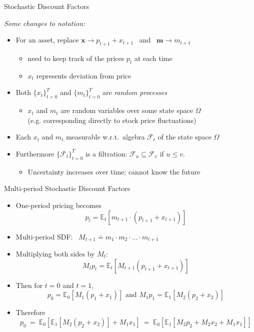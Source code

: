 \documentclass[aspectratio=1610]{beamer}
\newcommand{\wrt}{w.r.t.\ }
\newcommand{\eq}{\ =\ }
\newcommand{\andsp}{\text{ \ \ and \ \ }}
\newcommand{\bb}{\mathbb}
\newcommand{\mc}{\mathcal}
\begin{document}
\begin{frame}{Stochastic Discount Factors}
\begin{flushleft}
  \em Some changes to notation:
  \vspace{-1ex}
\end{flushleft}
\begin{itemize}
  \item For an asset, replace $\bm x \rightarrow p_{t+1} + x_{t+1}$ \ and \ $\bm m \rightarrow m_{t+1}$
  \begin{itemize}
    \item need to keep track of the prices $p_t$ at each time
    \item $x_t$ represents deviation from price
  \end{itemize}
  \item Both $\{x_t\}_{t=0}^T$ and $\{m_t\}_{t=0}^T$ are {\em random processes}
  \begin{itemize}
    \item $x_t$ and $m_t$ are random variables over some state space $\Omega$
    \\ (e.g. corresponding directly to stock price fluctuations)
  \end{itemize}
  \item Each $x_t$ and $m_t$ measurable \wrt algebra $\mc F_t$ of the state space $\Omega$
  \item Furthermore $\{\mc F_t\}_{t=0}^T$ is a filtration: $\mc F_u \subseteq \mc F_v$ if $u \leq v$.
  \begin{itemize}
    \item Uncertainty increases over time; cannot know the future
  \end{itemize}
\end{itemize}
\end{frame}

\begin{frame}{Multi-period Stochastic Discount Factors}
\begin{itemize}
  \item One-period pricing becomes
  \begin{equation}
    p_t = \bb E_t\left[m_{t+1}\cdot(p_{t+1} + x_{t+1})\right]
  \end{equation}
  \item Multi-period SDF: \ $M_{t+1} \doteq m_1\cdot m_2 \cdot \ldots \cdot m_{t+1}$
  \item Multiplying both sides by $M_t$:
  \begin{equation}
    M_t p_t = \bb E_t\left[M_{t+1}(p_{t+1}+x_{t+1})\right]
  \end{equation}
  \item Then for $t=0$ and $t=1$,
  $$p_0 = \bb E_0\left[M_1(p_1+x_1)\right] \andsp M_1p_1 = \bb E_1\left[M_2(p_2+x_2)\right]$$
  \item Therefore
  \begin{equation}
    p_0
    \eq \bb E_0\left[\bb E_1 \left[M_2(p_2+x_2)\right] + M_1 x_1\right]
    \eq \bb E_0\left[\bb E_1 \left[M_2p_2+M_2x_2+M_1x_1\right]\right]
  \end{equation}
\end{itemize}
\end{frame}
\end{document}

